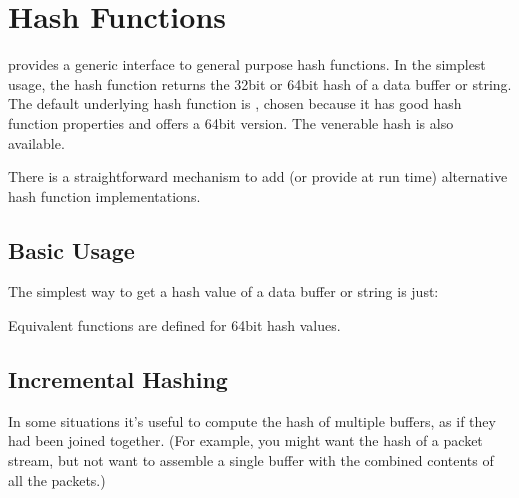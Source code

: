 \documentclass[letterpaper,10pt,english]{sphinxmanual}
\begin{document}
\chapter{Hash Functions}
\label{\detokenize{hash-functions:hash-functions}}\label{\detokenize{hash-functions::doc}}
 provides a generic interface to general purpose hash functions.
In the simplest usage, the hash function returns the 32\sphinxhyphen{}bit or 64\sphinxhyphen{}bit
hash of a data buffer or string.  The default underlying hash function
is , chosen because it has good hash function properties and
offers a 64\sphinxhyphen{}bit version.  The venerable  hash is also available.

There is a straight\sphinxhyphen{}forward mechanism to
add (or provide at run time) alternative hash function implementations.


\section{Basic Usage}
\label{\detokenize{hash-functions:basic-usage}}
The simplest way to get a hash value of a data buffer or string is just:

\begin{sphinxVerbatim}[commandchars=\\\{\}]
 

  

    
   

       

 
     
\end{sphinxVerbatim}

Equivalent functions are defined for 64\sphinxhyphen{}bit hash values.


\section{Incremental Hashing}
\label{\detokenize{hash-functions:incremental-hashing}}
In some situations it’s useful to compute the hash of multiple buffers,
as if they had been joined together.  (For example, you might want
the hash of a packet stream, but not want to assemble a single buffer
with the combined contents of all the packets.)
\end{document}
